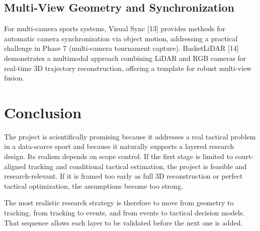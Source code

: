 \documentclass[a4paper]{article}
\begin{document}
\subsection{Multi-View Geometry and Synchronization}

For multi-camera sports systems, Visual Sync [13] provides methods for automatic camera synchronization via object motion, addressing a practical challenge in Phase 7 (multi-camera tournament capture). BasketLiDAR [14] demonstrates a multimodal approach combining LiDAR and RGB cameras for real-time 3D trajectory reconstruction, offering a template for robust multi-view fusion.

\section{Conclusion}
The project is scientifically promising because it addresses a real tactical problem in a data-scarce sport and because it naturally supports a layered research design. Its realism depends on scope control. If the first stage is limited to court-aligned tracking and conditional tactical estimation, the project is feasible and research-relevant. If it is framed too early as full 3D reconstruction or perfect tactical optimization, the assumptions become too strong.

The most realistic research strategy is therefore to move from geometry to tracking, from tracking to events, and from events to tactical decision models. That sequence allows each layer to be validated before the next one is added.
\end{document}
